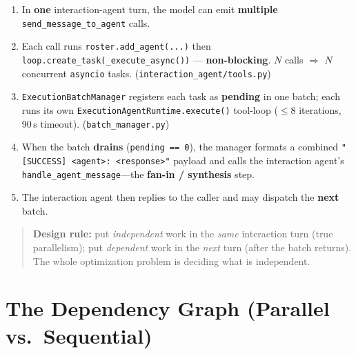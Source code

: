 \documentclass[11pt,a4paper]{article}
\begin{document}
\begin{enumerate}[leftmargin=*]
  \item In \textbf{one} interaction-agent turn, the model can emit \textbf{multiple}
  \texttt{send\_message\_to\_agent} calls.
  \item Each call runs \texttt{roster.add\_agent(...)} then \texttt{loop.create\_task(\_execute\_async())} ---
  \textbf{non-blocking}. $N$ calls $\Rightarrow$ $N$ concurrent \texttt{asyncio} tasks.
  (\texttt{interaction\_agent/tools.py})
  \item \texttt{ExecutionBatchManager} registers each task as \textbf{pending} in one batch; each runs its own
  \texttt{ExecutionAgentRuntime.execute()} tool-loop ($\le 8$ iterations, 90\,s timeout).
  (\texttt{batch\_manager.py})
  \item When the batch \textbf{drains} (\texttt{pending == 0}), the manager formats a combined
  \texttt{"[SUCCESS] <agent>: <response>"} payload and calls the interaction agent's
  \texttt{handle\_agent\_message}---the \textbf{fan-in / synthesis} step.
  \item The interaction agent then replies to the caller and may dispatch the \textbf{next} batch.
\end{enumerate}

\begin{quote}
\textbf{Design rule:} put \emph{independent} work in the \emph{same} interaction turn (true parallelism); put
\emph{dependent} work in the \emph{next} turn (after the batch returns). The whole optimization problem is
deciding what is independent.
\end{quote}

\section{The Dependency Graph (Parallel vs.\ Sequential)}
\end{document}
